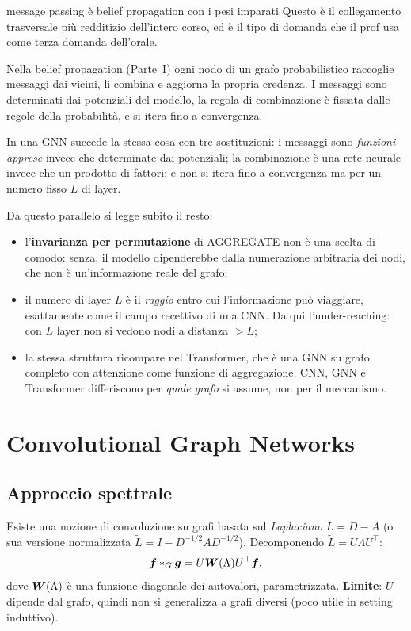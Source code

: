 \begin{intuizione}{message passing è belief propagation con i pesi imparati}
Questo è il collegamento trasversale più redditizio dell'intero corso, ed è il tipo di domanda che il prof usa come terza domanda dell'orale.

Nella belief propagation (Parte~I) ogni nodo di un grafo probabilistico raccoglie messaggi dai vicini, li combina e aggiorna la propria credenza. I messaggi sono determinati dai potenziali del modello, la regola di combinazione è fissata dalle regole della probabilità, e si itera fino a convergenza.

In una GNN succede la stessa cosa con tre sostituzioni: i messaggi sono \emph{funzioni apprese} invece che determinate dai potenziali; la combinazione è una rete neurale invece che un prodotto di fattori; e non si itera fino a convergenza ma per un numero fisso $L$ di layer.

Da questo parallelo si legge subito il resto:
\begin{itemize}[leftmargin=1.4em]
  \item l'\textbf{invarianza per permutazione} di AGGREGATE non è una scelta di comodo: senza, il modello dipenderebbe dalla numerazione arbitraria dei nodi, che non è un'informazione reale del grafo;
  \item il numero di layer $L$ è il \emph{raggio} entro cui l'informazione può viaggiare, esattamente come il campo recettivo di una CNN. Da qui l'under-reaching: con $L$ layer non si vedono nodi a distanza $> L$;
  \item la stessa struttura ricompare nel Transformer, che è una GNN su grafo completo con attenzione come funzione di aggregazione. CNN, GNN e Transformer differiscono per \emph{quale grafo} si assume, non per il meccanismo.
\end{itemize}
\end{intuizione}

\section{Convolutional Graph Networks}

\subsection{Approccio spettrale}
Esiste una nozione di convoluzione su grafi basata sul \emph{Laplaciano} $L = D - A$ (o sua versione normalizzata $\tilde L = I - D^{-1/2} A D^{-1/2}$). Decomponendo $\tilde L = U \Lambda U^\top$:
\[
\bm{f} *_G \bm{g} = U \bm{W}(\Lambda) U^\top \bm{f},
\]
dove $\bm{W}(\Lambda)$ è una funzione diagonale dei autovalori, parametrizzata. \textbf{Limite}: $U$ dipende dal grafo, quindi non si generalizza a grafi diversi (poco utile in setting induttivo).


